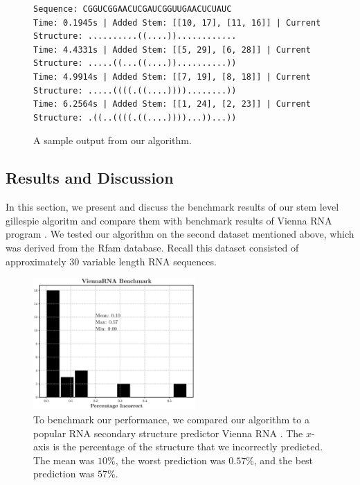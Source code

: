 \documentclass[11pt]{article}
\begin{document}
\begin{figure}[H]
\begin{small}
\begin{verbatim}
Sequence: CGGUCGGAACUCGAUCGGUUGAACUCUAUC
Time: 0.1945s | Added Stem: [[10, 17], [11, 16]] | Current Structure: ..........((....))............
Time: 4.4331s | Added Stem: [[5, 29], [6, 28]] | Current Structure: .....((...((....))..........))
Time: 4.9914s | Added Stem: [[7, 19], [8, 18]] | Current Structure: .....((((.((....))))........))
Time: 6.2564s | Added Stem: [[1, 24], [2, 23]] | Current Structure: .((..((((.((....))))...))...))
\end{verbatim}
\end{small}
\caption{A sample output from our algorithm.}
\end{figure}

\begin{multicols}{2}
\subsection{Results and Discussion}

In this section, we present and discuss the benchmark results of our stem level gillespie algoritm and compare them with benchmark results of Vienna RNA program \cite{Lorenz2011}. We tested our algorithm on the second dataset mentioned above, which was derived from the Rfam database. Recall this dataset consisted of approximately 30 variable length RNA sequences.

\begin{figure}[H]
\centering
\includegraphics[width = 0.55\textwidth]{fig/v_rna_bench}
\caption{To benchmark our performance, we compared our algorithm to a popular RNA secondary structure predictor Vienna RNA \cite{Lorenz2011}. The $x$-axis is the percentage of the structure that we incorrectly predicted. The mean was $10\%$, the worst prediction was $0.57\%$, and the best prediction was $57\%$. }
\label{fig:vbench}
\end{figure}


\end{multicols}
\end{document}
